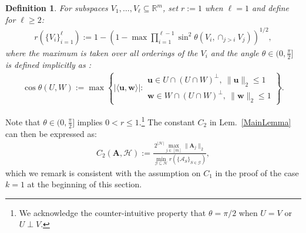 \documentclass[9pt,twocolumn]{pnas-new}
\newtheorem{definition}{Definition}
\begin{document}
\begin{definition}\label{SpecialSupportSet}\label{FriedrichsDefinition}
For subspaces $V_1, \ldots, V_\ell \subseteq \mathbb{R}^m$, set $r := 1$ when $\ell = 1$ and define for $\ell \geq 2$:
\begin{align*}
r(\{V_i\}_{i=1}^\ell) := 1 - \left(1 -  \max \prod_{i=1}^{\ell-1} \sin^2  \theta \left(V_i, \cap_{j>i} V_j \right)  \right)^{1/2},
\end{align*} 
%
where the maximum is taken over all orderings 
of the $V_i$ and the angle $\theta \in (0,\frac{\pi}{2}]$ is defined implicitly as \cite[Def.~9.4]{Deutsch12}:
\begin{align*}
\cos{\theta(U,W)} := \max\left\{ |\langle \mathbf{u}, \mathbf{w} \rangle|: \substack{ \mathbf{u} \in U \cap (U \cap W)^\perp, \ \|\mathbf{u}\|_2 \leq 1 \\ \mathbf{w} \in W \cap (U \cap W)^\perp, \  \|\mathbf{w}\|_2 \leq 1 } \right\}.
\end{align*}
\end{definition}
Note that $\theta \in (0,\frac{\pi}{2}]$ implies $0 < r \leq 1$.\footnote{We acknowledge the counter-intuitive property that $\theta =  \pi/2$ when $U = V$ or $U \perp V$.}  
The constant $C_2$ in Lem.~\ref{MainLemma} can then be expressed as:  
\begin{align}\label{Cdef2}
C_2(\mathbf{A}, \mathcal{H}) := \frac{ 2^{|\mathcal{H}|} \max_{j \in [m]} \|\mathbf{A}_j\|_2}{ \min_{\mathcal{G} \subseteq \mathcal{H}} r( \{ \bm{\mathcal{A}}_S \}_{S \in \mathcal{G}}) },
\end{align}
%
which we remark is consistent with the assumption on $C_1$ in the proof of the case $k=1$ at the beginning of this section.
\end{document}
